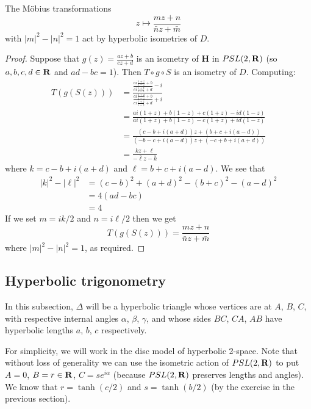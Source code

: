 \documentclass[12pt]{article}
\begin{document}
\begin{lma}
  The M\"obius transformations
  \[z\mapsto\frac{mz+n}{\bar{n}z+\bar{m}}\]
  with $|m|^2-|n|^2=1$ act by hyperbolic isometries of $D$.
\end{lma}
\begin{proof}
  Suppose that $g(z)=\frac{az+b}{cz+d}$ is an isometry of $\mathbf{H}$ in $PSL(2,\mathbf{R})$ (so $a,b,c,d\in\mathbf{R}$ and $ad-bc=1$). Then $T\circ g\circ S$ is an isometry of $D$. Computing:
  \begin{align*}
    T(g(S(z)))&=\frac{\frac{ai\frac{1+z}{1-z}+b}{ci\frac{1+z}{1-z}+d}-i}{\frac{ai\frac{1+z}{1-z}+b}{ci\frac{1+z}{1-z}+d}+i}\\
    &=\frac{ai(1+z)+b(1-z)+c(1+z)-id(1-z)}{ai(1+z)+b(1-z)-c(1+z)+id(1-z)}\\
    &=\frac{(c-b+i(a+d))z+(b+c+i(a-d))}{(-b-c+i(a-d))z+(-c+b+i(a+d))}\\
    &=\frac{kz+\ell}{-\bar{\ell}z-\bar{k}}
  \end{align*}
  where $k=c-b+i(a+d)$ and $\ell=b+c+i(a-d)$. We see that
  \begin{align*}
    |k|^2-|\ell|^2&=(c-b)^2+(a+d)^2-(b+c)^2-(a-d)^2\\
    &=4(ad-bc)\\
    &=4
  \end{align*}
  If we set $m=ik/2$ and $n=i\ell/2$ then we get
  \[T(g(S(z)))=\frac{mz+n}{\bar{n}z+\bar{m}}\]
  where $|m|^2-|n|^2=1$, as required.
\end{proof}

\subsection{Hyperbolic trigonometry}

In this subsection, $\Delta$ will be a hyperbolic triangle whose vertices are at $A$, $B$, $C$, with respective internal angles $\alpha$, $\beta$, $\gamma$, and whose sides $BC$, $CA$, $AB$ have hyperbolic lengths $a$, $b$, $c$ respectively.

For simplicity, we will work in the disc model of hyperbolic 2-space. Note that without loss of generality we can use the isometric action of $PSL(2,\mathbf{R})$ to put $A=0$, $B=r\in\mathbf{R}$, $C=se^{i\alpha}$ (because $PSL(2,\mathbf{R})$ preserves lengths and angles). We know that $r=\tanh(c/2)$ and $s=\tanh(b/2)$ (by the exercise in the previous section).
\end{document}
